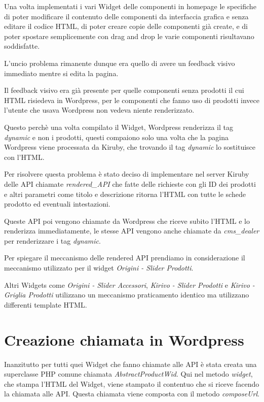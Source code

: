 


Una volta implementati i vari Widget delle componenti in homepage le specifiche di poter
modificare il contenuto delle componenti da interfaccia grafica e senza editare
il codice HTML, di poter creare copie delle componenti già create, e di poter spostare
semplicemente con drag and drop le varie componenti risultavano soddisfatte.

L'uncio problema rimanente dunque era quello di avere un feedback visivo immediato mentre si edita
la pagina.

Il feedback visivo era già presente per quelle componenti senza prodotti il cui HTML risiedeva in Wordpress,
per le componenti che fanno uso di prodotti invece l'utente che usava Wordpress non vedeva niente renderizzato.

Questo perchè una volta compilato il Widget, Wordpress renderizza il tag \emph{dynamic} e non i prodotti,
questi compaiono solo una volta che la pagina Wordpress viene processata da Kiruby, che trovando il tag \emph{dynamic}
lo sostituisce con l'HTML.

Per risolvere questa problema è stato deciso di implementare nel server Kiruby delle API chiamate
\emph{rendered\_API} che fatte delle richieste con gli ID dei prodotti e altri parametri come titolo e descrizione
ritorna l'HTML con tutte le schede prodotto ed eventuali intestazioni.

Queste API poi vengono chiamate da Wordpress che riceve subito l'HTML e lo renderizza immediatamente,
le stesse API vengono anche chiamate da \emph{cms\_dealer} per renderizzare i tag \emph{dynamic}.

Per spiegare il meccanismo delle rendered API prendiamo in considerazione il meccanismo utilizzato per il widget
\emph{Origini - Slider Prodotti}.

Altri Widgets come \emph{Origini - Slider Accessori}, \emph{Kirivo - Slider Prodotti} e \emph{Kirivo - Griglia Prodotti}
utilizzano un meccanismo praticamento identico ma utilizzano differenti template HTML.

\section{Creazione chiamata in Wordpress}
Inanzitutto per tutti quei Widget che fanno chiamate alle API è stata creata una superclasse PHP comune chiamata
\emph{AbstractProductWid}.
Qui nel metodo \emph{widget}, che stampa l'HTML del Widget, viene stampato il contentuo che si riceve facendo la chiamata alle
API. Questa chiamata viene composta con il metodo \emph{composeUrl}.

